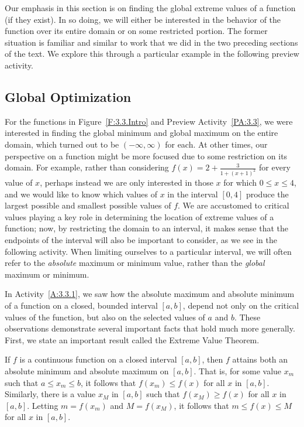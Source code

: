 Our emphasis in this section is on finding the global extreme values of a function (if they exist).  In so doing, we will either be interested in the behavior of the function over its entire domain or on some restricted portion.  The former situation is familiar and similar to work that we did in the two preceding sections of the text.  We explore this through a particular example in the following preview activity.


\subsection*{Global Optimization}

For the functions in Figure~\ref{F:3.3.Intro} and Preview Activity~\ref{PA:3.3}, we were interested in finding the global minimum and global maximum on the entire domain, which turned out to be $(-\infty, \infty)$ for each.  At other times, our perspective on a function might be more focused due to some restriction on its domain.  For example, rather than considering $f(x) = 2 + \frac{3}{1+(x+1)^2}$ for every value of $x$,  perhaps instead we are only interested in those $x$ for which $0 \le x \le 4$, and we would like to know which values of $x$ in the interval $[0,4]$ produce the largest possible and smallest possible values of $f$.  We are accustomed to critical values playing a key role in determining the location of extreme values of a function; now, by restricting the domain to an interval, it makes sense that the endpoints of the interval will also be important to consider, as we see in the following activity.  When limiting ourselves to a particular interval, we will often refer to the \emph{absolute} maximum or minimum value, rather than the \emph{global} maximum or minimum.


In Activity~\ref{A:3.3.1}, we saw how the absolute maximum and absolute minimum of a function on a closed, bounded interval $[a,b]$, depend not only on the critical values of the function, but also on the selected values of $a$ and $b$.  These observations demonstrate several important facts that hold much more generally.  First, we state an important result called the Extreme Value Theorem.

{If $f$ is a continuous function on a closed interval $[a,b]$, then $f$ attains both an absolute minimum and absolute maximum on $[a,b]$.  That is, for some value $x_m$ such that $a \le x_m \le b$, it follows that $f(x_m) \le f(x)$ for all $x$ in $[a,b]$.  Similarly, there is a value $x_M$ in $[a,b]$ such that $f(x_M) \geq f(x)$ for all $x$ in $[a,b]$.  Letting $m = f(x_m)$ and $M = f(x_M)$, it follows that $m \le f(x) \le M$ for all $x$ in $[a,b]$.
} %


